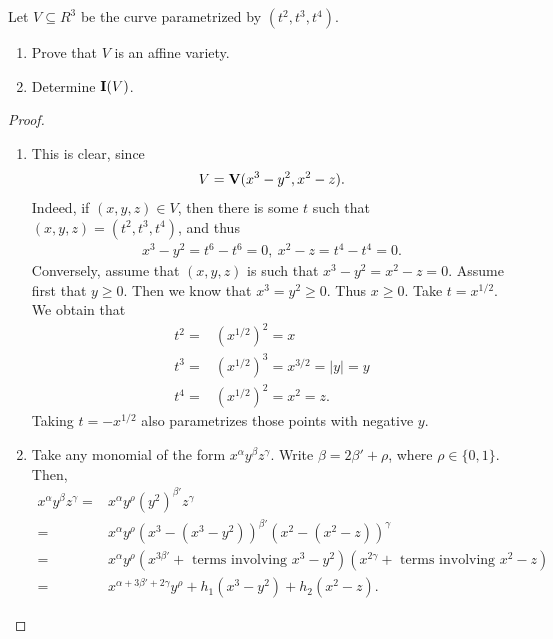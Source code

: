 \begin{exercise}{12}
Let $V\subseteq R^3$ be the curve parametrized by $(t^2, t^3, t^4)$.
\begin{enumerate}
    \item Prove that $V$ is an affine variety.
    \item Determine $\mathbf{I}(V)$.
\end{enumerate}
\end{exercise}
\begin{proof}
        \begin{enumerate}
        \item This is clear, since 
        \begin{align*}
            V = \mathbf{V}(x^3 - y^2, x^2 - z).
        \end{align*}
        Indeed, if $(x,y,z)\in V$, then there is some $t$ such that $(x,y,z) = (t^2,t^3,t^4)$, and thus
        \begin{align*}
            x^3 - y^2 = t^6 - t^6 = 0,~x^2 - z = t^4 - t^4 = 0.
        \end{align*}
        Conversely, assume that $(x,y,z)$ is such that $x^3 - y^2 = x^2 - z = 0$. 
        Assume first that $y\geq 0$. 
        Then we know that $x^3 = y^2 \geq 0$. Thus $x\geq 0$. 
        Take $t = x^{1/2}$. 
        We obtain that
        \begin{align*}
            t^2 =& (x^{1/2})^2 = x\\
            t^3 =& (x^{1/2})^3 = x^{3/2} = |y| = y\\
            t^4 =& (x^{1/2})^2 = x^2 = z.
        \end{align*}
        Taking $t = -x^{1/2}$ also parametrizes those points with negative $y$.
        \item Take any monomial of the form $x^\alpha y^\beta z^\gamma$. 
        Write $\beta = 2\beta' + \rho$, where $\rho\in \{0,1\}$. 
        Then,
        \begin{align*}
            x^\alpha y^\beta z^\gamma 
            =& x^\alpha y^\rho (y^2)^{\beta'} z^\gamma\\
            =& x^\alpha y^\rho (x^3 - (x^3 - y^2))^{\beta'} (x^2 - (x^2 - z))^\gamma\\
            =& x^\alpha y^\rho (x^{3\beta'} + \text{ terms involving } x^3 - y^2)(x^{2\gamma} + \text{ terms involving } x^2 - z)\\
            =& x^{\alpha + 3\beta' + 2\gamma} y^\rho + h_1(x^3 - y^2) + h_2(x^2 - z).
        \end{align*}

\end{enumerate}
\end{proof}
